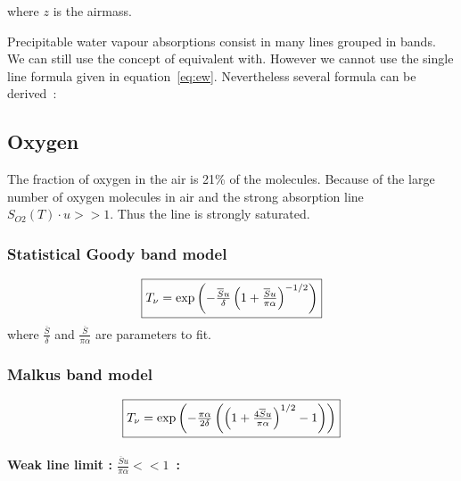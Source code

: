 \documentclass[a4paper]{article}
\begin{document}
{where $z$ is the airmass.


Precipitable water vapour absorptions consist in many lines grouped in bands. We can still use the concept of equivalent with. However we cannot use the single line
formula given in equation~\ref{eq:ew}.
Nevertheless several formula can be derived~:

\subsection{Oxygen}
The fraction of oxygen in the air is 21\% of the molecules. Because of the large number of oxygen molecules in air  and the strong absorption line $S_{O2}(T)\cdot u >>1$. Thus the line is strongly saturated.

 



\subsubsection{Statistical Goody band model}

\begin{equation}
\fbox{$
T_\nu=\exp\left( - \frac{\overline{S}u}{\delta}\left( 1+\frac{\overline{S}u}{\pi \alpha} \right)^{-1/2} \right)
$}
\end{equation}
where $\frac{\overline{S}}{\delta}$ and $\frac{\overline{S}}{\pi \alpha}$ are parameters to fit.

\subsubsection{Malkus band model}

\begin{equation}
\fbox{$
T_\nu=\exp \left(
 - \frac{\pi \alpha}{2\delta}\left( \left(1+\frac{4\overline{S}u}{\pi \alpha} \right)^{1/2}  -1\right)
 \right)
$}
\end{equation}

\paragraph{Weak line limit : $\frac{\overline{S}u}{\pi \alpha}<<1$~:}

}
\end{document}

